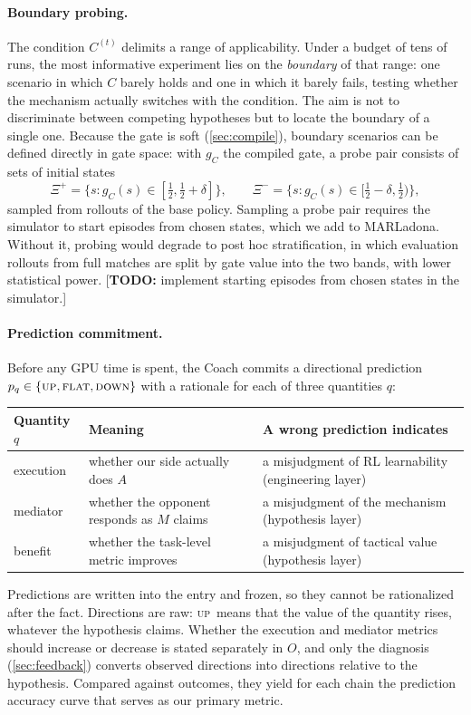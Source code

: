 \documentclass[11pt]{article}
\newcommand{\todo}[1]{\textcolor{BrickRed}{[\textbf{TODO:} #1]}}
\newcommand{\pUp}{\textsc{up}}
\newcommand{\pFlat}{\textsc{flat}}
\newcommand{\pDown}{\textsc{down}}
\begin{document}
\paragraph{Boundary probing.}
The condition $C^{(t)}$ delimits a range of applicability.
Under a budget of tens of runs, the most informative experiment lies on the \emph{boundary} of that range: one scenario in which $C$ barely holds and one in which it barely fails, testing whether the mechanism actually switches with the condition.
The aim is not to discriminate between competing hypotheses but to locate the boundary of a single one.
Because the gate is soft (\cref{sec:compile}), boundary scenarios can be defined directly in gate space: with $g_C$ the compiled gate, a probe pair consists of sets of initial states
\begin{equation}
  \Xi^{+} = \{ s : g_C(s) \in [\tfrac12, \tfrac12+\delta] \}, \qquad
  \Xi^{-} = \{ s : g_C(s) \in [\tfrac12-\delta, \tfrac12) \},
\end{equation}
sampled from rollouts of the base policy.
Sampling a probe pair requires the simulator to start episodes from chosen states, which we add to MARLadona.
Without it, probing would degrade to post hoc stratification, in which evaluation rollouts from full matches are split by gate value into the two bands, with lower statistical power.
\todo{implement starting episodes from chosen states in the simulator.}

\paragraph{Prediction commitment.}
Before any GPU time is spent, the Coach commits a directional prediction $p_q \in \{\pUp, \pFlat, \pDown\}$ with a rationale for each of three quantities $q$:
\begin{center}\small
\begin{tabularx}{0.92\linewidth}{@{}l X X@{}}
\toprule
Quantity $q$ & Meaning & A wrong prediction indicates \\
\midrule
execution & whether our side actually does $A$ & a misjudgment of RL learnability (engineering layer) \\
mediator & whether the opponent responds as $M$ claims & a misjudgment of the mechanism (hypothesis layer) \\
benefit & whether the task-level metric improves & a misjudgment of tactical value (hypothesis layer) \\
\bottomrule
\end{tabularx}
\end{center}
Predictions are written into the entry and frozen, so they cannot be rationalized after the fact.
Directions are raw: \pUp\ means that the value of the quantity rises, whatever the hypothesis claims.
Whether the execution and mediator metrics should increase or decrease is stated separately in $O$, and only the diagnosis (\cref{sec:feedback}) converts observed directions into directions relative to the hypothesis.
Compared against outcomes, they yield for each chain the prediction accuracy curve that serves as our primary metric.
\end{document}
